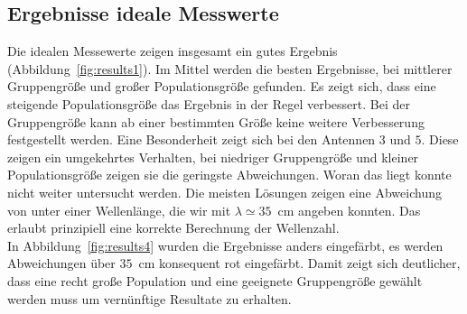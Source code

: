 \subsection{Ergebnisse ideale Messwerte}
%
Die idealen Messewerte zeigen insgesamt ein gutes Ergebnis (Abbildung~\ref{fig:results1}). Im Mittel werden die besten Ergebnisse, bei mittlerer Gruppengröße und großer Populationsgröße gefunden. Es zeigt sich, dass eine steigende Populationsgröße das Ergebnis in der Regel verbessert. Bei der Gruppengröße kann ab einer bestimmten Größe keine weitere Verbesserung festgestellt werden. Eine Besonderheit zeigt sich bei den Antennen $3$ und $5$. Diese zeigen ein umgekehrtes Verhalten, bei niedriger Gruppengröße und kleiner Populationsgröße zeigen sie die geringste Abweichungen. Woran das liegt konnte nicht weiter untersucht werden. Die meisten Lösungen zeigen eine Abweichung von unter einer Wellenlänge, die wir mit $\lambda\simeq35$~cm angeben konnten. Das erlaubt prinzipiell eine korrekte Berechnung der Wellenzahl.\\

In Abbildung~\ref{fig:results4} wurden die Ergebnisse anders eingefärbt, es werden Abweichungen über $35$~cm konsequent rot eingefärbt. Damit zeigt sich deutlicher, dass eine recht große Population und eine geeignete Gruppengröße gewählt werden muss um vernünftige Resultate zu erhalten.
%
%
